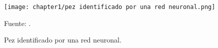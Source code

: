 \begin{figure}[H]
	\centering
	\texttt{[image: chapter1/pez identificado por una red neuronal.png]}
	\caption{Pez identificado por una red neuronal.}
	Fuente: \cite{Varalakshmi2019}.
	\label{fig:pez identificado por una red neuronal}
\end{figure}



